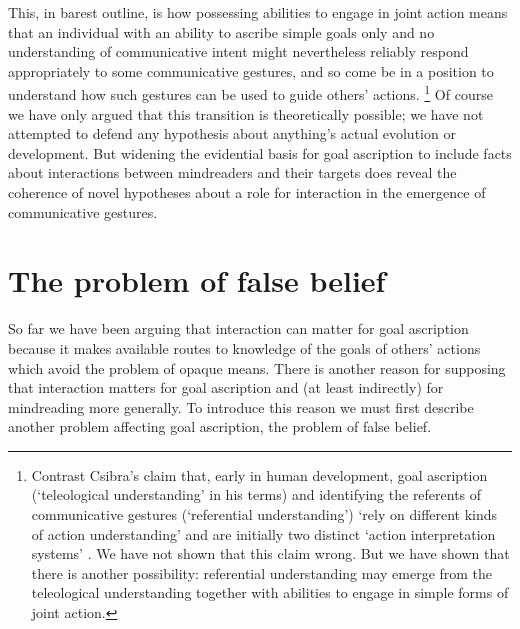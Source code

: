 \documentclass[12pt,\papersize]{extarticle}
\begin{document}
This, in barest outline, is 
how
possessing abilities to engage in joint action
means that 
an individual with an ability to ascribe simple goals only and no understanding of communicative intent
might 
nevertheless reliably respond appropriately to some communicative gestures,
and so come be in a position to understand how such gestures can be used to guide others' actions.%
\footnote{
Contrast Csibra's claim that,
early in human development,
goal ascription (`teleological understanding' in his terms)
and 
identifying the referents of communicative gestures (`referential understanding')
`rely on different kinds of action understanding' %
and
are initially two distinct `action interpretation systems'   \citep[p.\ 456]{Csibra:2003kp}.
We have not shown that this claim wrong.
But we have shown that there is another possibility:
 referential understanding may 
emerge from
the teleological understanding 
 together with abilities to engage in simple forms of joint action.
}
Of course we have only argued that this transition is theoretically possible;
we have not attempted to defend any hypothesis about 
anything's actual evolution or development.
But widening the evidential basis for goal ascription to include facts about interactions between mindreaders and their targets 
does reveal the coherence of  
novel hypotheses about a role for interaction in the emergence  of communicative gestures.






\section{The problem of false belief}
\label{sec:false_belief}
So far we have been arguing that interaction can matter for goal ascription
because it  makes available routes to knowledge of the goals of others' actions
which avoid the problem of opaque means.
There is another reason for supposing that interaction matters for goal ascription and (at least indirectly) for mindreading more generally.
To introduce this reason we must first describe another problem affecting goal ascription, the problem of false belief.
\end{document}
